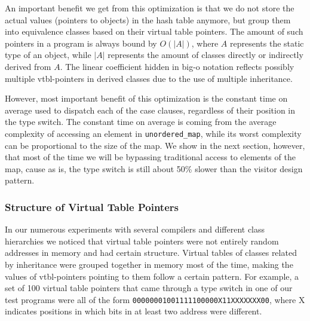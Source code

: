 \documentclass[preprint]{sigplanconf}
\makeatletter
\DeclareRobustCommand{\code}[1]{{\lstinline[breaklines=false,escapechar=@]{#1}}}
\makeatother
\begin{document}
An important benefit we get from this optimization is that we do not store the 
actual values (pointers to objects) in the hash table anymore, but group them 
into equivalence classes based on their virtual table pointers. The amount of 
such pointers in a program is always bound by $O(|A|)$, where $A$ represents the 
static type of an object, while $|A|$ represents the amount of classes directly 
or indirectly derived from $A$. The linear coefficient hidden in big-o notation 
reflects possibly multiple vtbl-pointers in derived classes due to the use of 
multiple inheritance.

However, most important benefit of this optimization is the constant time on average 
used to dispatch each of the case clauses, regardless of their position in the 
type switch. The constant time on average is coming from the average complexity 
of accessing an element in \code{unordered_map}, while its worst complexity can 
be proportional to the size of the map. We show in the next section, however, 
that most of the time we will be bypassing traditional access to elements of the 
map, cause as is, the type switch is still about 50\% slower than the visitor 
design pattern.


\subsubsection{Structure of Virtual Table Pointers}
\label{sec:sovtp}

In our numerous experiments with several compilers and different class 
hierarchies we noticed that virtual table pointers were not entirely random 
addresses in memory and had certain structure. Virtual tables of classes related 
by inheritance were grouped together in memory most of the time, making the 
values of vtbl-pointers pointing to them follow a certain pattern. For example, 
a set of 100 virtual table pointers that came through a type switch in one of 
our test programs were all of the form 
\texttt{00000001001111100000X11XXXXXXX00}, where X indicates positions in which 
bits in at least two address were different.
\end{document}
